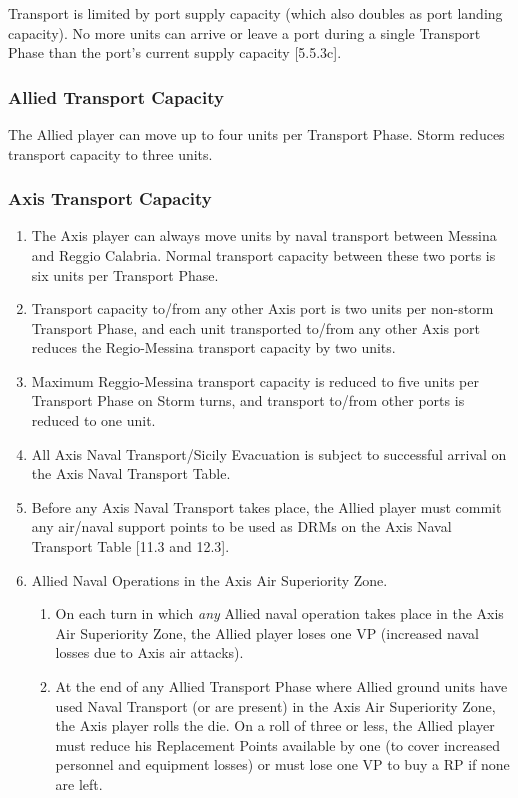 \subsubsection{} Transport is limited by port supply capacity (which also doubles as port landing capacity). No more units can arrive or leave a port during a single Transport Phase than the port's current supply capacity [5.5.3c].

\subsubsection{\textbf{Allied Transport Capacity}}

The Allied player can move up to four units per Transport Phase. Storm reduces transport capacity to three units.

\subsubsection{\textbf{Axis Transport Capacity}}
\begin{enumerate}[label=\alph*.]
    \item The Axis player can always move units by naval transport between Messina and Reggio Calabria. Normal transport capacity between these two ports is six units per Transport Phase.
    \item Transport capacity to/from any other Axis port is two units per non-storm Transport Phase, and each unit transported to/from any other Axis port reduces the Regio-Messina transport capacity by two units.
    \item Maximum Reggio-Messina transport capacity is reduced to five units per Transport Phase on Storm turns, and transport to/from other ports is reduced to one unit.
    \item All Axis Naval Transport/Sicily Evacuation is subject to successful arrival on the Axis Naval Transport Table.
    \item Before any Axis Naval Transport takes place, the Allied player must commit any air/naval support points to be used as DRMs on the Axis Naval Transport Table [11.3 and 12.3].
    \item Allied Naval Operations in the Axis Air Superiority Zone.
    \begin{enumerate}[label=\arabic*)]
        \item On each turn in which \textit{any} Allied naval operation takes place in the Axis Air Superiority Zone, the Allied player loses one VP (increased naval losses due to Axis air attacks).
        \item At the end of any Allied Transport Phase where Allied ground units have used Naval Transport (or are present) in the Axis Air Superiority Zone, the Axis player rolls the die. On a roll of three or less, the Allied player must reduce his Replacement Points available by one (to cover increased personnel and equipment losses) or must lose one VP to buy a RP if none are left.
    \end{enumerate}
\end{enumerate}